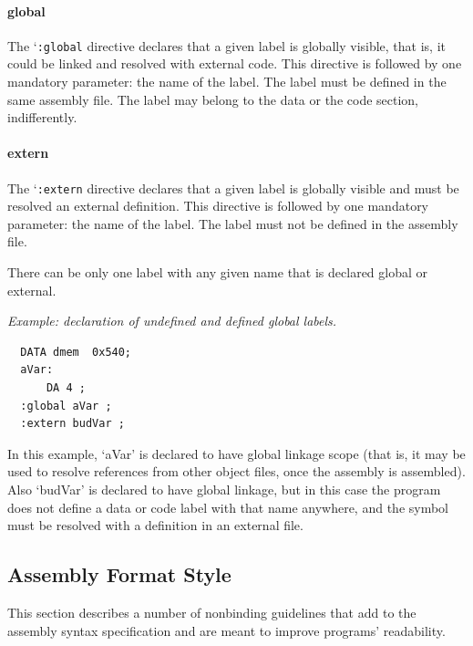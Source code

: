 \documentclass[twoside]{tceusermanual}
\begin{document}
\paragraph{global}
The `\verb|:global| directive declares that a given label is globally
visible, that is, it could be linked and resolved with external code. This
directive is followed by one mandatory parameter: the name of the label. The
label must be defined in the same assembly file. The label may belong to the
data or the code section, indifferently.

\paragraph{extern}
The `\verb|:extern| directive declares that a given label is globally
visible and must be resolved an external definition. This directive is
followed by one mandatory parameter: the name of the label. The label must
not be defined in the assembly file.

There can be only one label with any given name that is declared global or
external.

\emph{Example: declaration of undefined and defined global labels.}
\begin{verbatim}
  DATA dmem  0x540;
  aVar:
      DA 4 ;
  :global aVar ;
  :extern budVar ;
\end{verbatim}
%
In this example, `aVar' is declared to have global linkage scope (that is,
it may be used to resolve references from other object files, once the
assembly is assembled). Also `budVar' is declared to have global linkage,
but in this case the program does not define a data or code label with that
name anywhere, and the symbol must be resolved with a definition in an
external file.

\subsection{Assembly Format Style}
\label{ssec:style}

This section describes a number of nonbinding guidelines that add to the
assembly syntax specification and are meant to improve programs'
readability.
\end{document}
